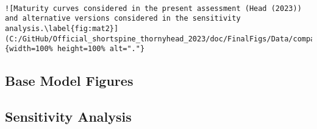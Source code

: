 \documentclass[11pt,
  english,
  letterpaper,
]{article}
\begin{document}
\begin{verbatim}

![Maturity curves considered in the present assessment (Head (2023)) and alternative versions considered in the sensitivity analysis.\label{fig:mat2}](C:/GitHub/Official_shortspine_thornyhead_2023/doc/FinalFigs/Data/comparison_alternative_maturity_curves.png){width=100% height=100% alt="."}
\end{verbatim}

\hypertarget{base-model-figures}{%
\subsection{Base Model Figures}\label{base-model-figures}}

\hypertarget{sensitivity-analysis}{%
\subsection{Sensitivity Analysis}\label{sensitivity-analysis}}
\end{document}
